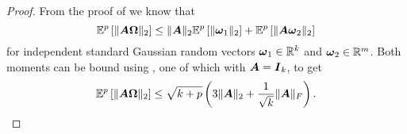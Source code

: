 \documentclass[12pt]{article}
\begin{document}
\begin{proof}
    From the proof of \cite[lemma B.1]{tropp-2023-randomized-algorithms} we know that 
    \begin{equation}
        \mathbb{E}^p\left[ \lVert \boldsymbol{A} \boldsymbol{\Omega} \rVert _2 \right]
        \leq \lVert \boldsymbol{A} \rVert _2 \mathbb{E}^p\left[ \lVert \boldsymbol{\omega}_1 \rVert _2 \right] + \mathbb{E}^p\left[ \lVert \boldsymbol{A} \boldsymbol{\omega}_2 \rVert _2 \right]
    \end{equation}
    for independent standard Gaussian random vectors $\boldsymbol{\omega}_1 \in \mathbb{R}^{k}$ and $\boldsymbol{\omega}_2 \in \mathbb{R}^{m}$. Both moments can be bound using , one of which with $\boldsymbol{A} = \boldsymbol{I}_k$, to get
    \begin{equation}
        \mathbb{E}^p\left[ \lVert \boldsymbol{A} \boldsymbol{\Omega} \rVert _2 \right]
        \leq \sqrt{k + p} \left( 3 \lVert \boldsymbol{A} \rVert _2 + \frac{1}{\sqrt{k}} \lVert \boldsymbol{A} \rVert _F \right).
    \end{equation}


\end{proof}
\end{document}
